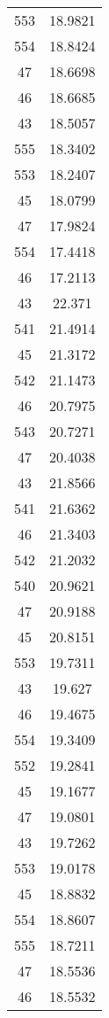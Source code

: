 \begin{tabular}[c]{|c|c|}
       553&   18.9821\\
       554&   18.8424\\
        47&   18.6698\\
        46&   18.6685\\
        43&   18.5057\\
       555&   18.3402\\
       553&   18.2407\\
        45&   18.0799\\
        47&   17.9824\\
       554&   17.4418\\
        46&   17.2113\\
        43&    22.371\\
       541&   21.4914\\
        45&   21.3172\\
       542&   21.1473\\
        46&   20.7975\\
       543&   20.7271\\
        47&   20.4038\\
        43&   21.8566\\
       541&   21.6362\\
        46&   21.3403\\
       542&   21.2032\\
       540&   20.9621\\
        47&   20.9188\\
        45&   20.8151\\
       553&   19.7311\\
        43&    19.627\\
        46&   19.4675\\
       554&   19.3409\\
       552&   19.2841\\
        45&   19.1677\\
        47&   19.0801\\
        43&   19.7262\\
       553&   19.0178\\
        45&   18.8832\\
       554&   18.8607\\
       555&   18.7211\\
        47&   18.5536\\
        46&   18.5532\\

\end{tabular}
